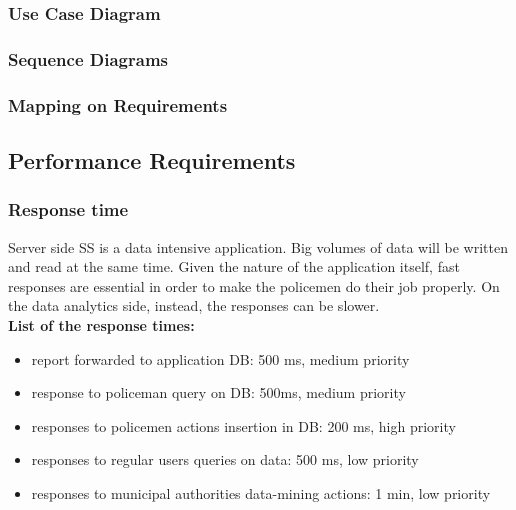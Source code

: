 	\subsubsection{Use Case Diagram}
	
	\subsubsection{Sequence Diagrams}
	
	\subsubsection{Mapping on Requirements}
	
\subsection{Performance Requirements}

	\subsubsection{Response time}
	
Server side SS is a data intensive application. Big volumes of data  will be written and read at the same time. Given the nature of the application itself, fast responses are essential in order to make the policemen do their job properly. On the data analytics side, instead, the responses can be slower.\\

\textbf{List of the response times:}
\begin{itemize}
\item report forwarded to application DB: 500 ms, medium priority
\item response to policeman query on DB: 500ms, medium priority
\item responses to policemen actions insertion in DB: 200 ms, high priority
\item responses to regular users queries on data: 500 ms, low priority
\item responses to municipal authorities data-mining actions: 1 min, low priority
\end{itemize}
